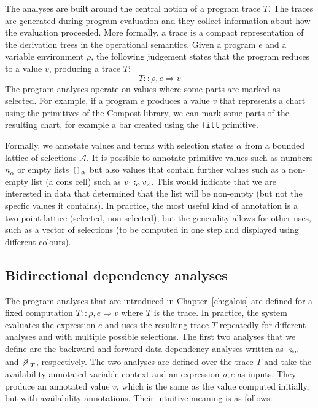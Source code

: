 \documentclass[fleqn,11pt]{report}
\theoremstyle{definition}
\begin{document}
The analyses are built around the central notion of a program trace $T$. The traces
are generated during program evaluation and they collect information about how the
evaluation proceeded. More formally, a trace is a compact representation of the derivation
trees in the operational semantics. Given a program $e$ and a variable environment $\rho$,
the following judgement states that the program reduces to a value $v$, producing a trace $T$:
%
\begin{equation*}
T :: \rho, e \Rightarrow v
\end{equation*}
%
The program analyses operate on values where some parts are marked as selected. For example,
if a program $e$ produces a value $v$ that represents a chart using the primitives of the Compost
library, we can mark some parts of the resulting chart, for example a bar created using the
\texttt{fill} primitive.

Formally, we annotate values and terms with selection states $\alpha$ from a bounded
lattice of selections $\mathcal{A}$. It is possible to annotate primitive values such as
numbers $n_\alpha$ or empty lists $\textnormal{\texttt{[]}}_\alpha$ but also values that
contain further values such as a non-empty list (a cons cell) such as
$v_1\, \textnormal{\textbf{:}}_\alpha\, v_2$. This would indicate that we are interested in
data that determined that the list will be non-empty (but not the specfic values it contains).
In practice, the most useful kind of annotation is a two-point lattice (selected, non-selected),
but the generality allows for other uses, such as a vector of selections (to be computed in one
step and displayed using different colours).

\subsection{Bidirectional dependency analyses}

The program analyses that are introduced in Chapter~\ref{ch:galois} are defined for a fixed
computation $T :: \rho, e \Rightarrow v$ where $T$ is the trace. In practice, the system evaluates
the expression $e$ and uses the resulting trace $T$ repeatedly for different analyses and
with multiple possible selections. The first two analyses that we define are the backward and
forward data dependency analyses written as $\evalFwdR{T}$ and $\evalBwdR{T}$, respectively.
The two analyses are defined over the trace $T$ and take the availability-annotated
variable context and an expression $\rho, e$ as inputs. They produce an annotated value
$v$, which is the same as the value computed initially, but with availability annotations.
Their intuitive meaning is as follows:
\end{document}
